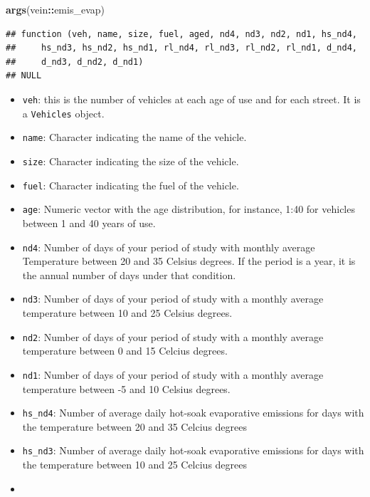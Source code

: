\documentclass[12pt,graybox,envcountchap,sectrefs]{krantz}
\makeatletter
\newenvironment{Shaded}{\begin{snugshade}}{\end{snugshade}}
\newcommand{\KeywordTok}[1]{\textcolor[rgb]{0.13,0.29,0.53}{\textbf{#1}}}
\newcommand{\OperatorTok}[1]{\textcolor[rgb]{0.81,0.36,0.00}{\textbf{#1}}}
\newcommand{\NormalTok}[1]{#1}
\providecommand{\tightlist}{%
  \setlength{\itemsep}{0pt}\setlength{\parskip}{0pt}}
\newenvironment{kframe}{%
\medskip{}
\setlength{\fboxsep}{.8em}
 \def\at@end@of@kframe{}%
 \ifinner\ifhmode%
  \def\at@end@of@kframe{\end{minipage}}%
  \begin{minipage}{\columnwidth}%
 \fi\fi%
 \def\FrameCommand##1{\hskip\@totalleftmargin \hskip-\fboxsep
 \colorbox{shadecolor}{##1}\hskip-\fboxsep
     \hskip-\linewidth \hskip-\@totalleftmargin \hskip\columnwidth}%
 \MakeFramed {\advance\hsize-\width
   \@totalleftmargin\z@ \linewidth\hsize
   \@setminipage}}%
 {\par\unskip\endMakeFramed%
 \at@end@of@kframe}
\renewenvironment{Shaded}{\begin{kframe}}{\end{kframe}}
\theoremstyle{definition}
\theoremstyle{definition}
\theoremstyle{definition}
\theoremstyle{remark}
\makeatother
\begin{document}
\begin{Shaded}
\begin{Highlighting}[]
\KeywordTok{args}\NormalTok{(vein}\OperatorTok{::}\NormalTok{emis_evap)}
\end{Highlighting}
\end{Shaded}

\begin{verbatim}
## function (veh, name, size, fuel, aged, nd4, nd3, nd2, nd1, hs_nd4, 
##     hs_nd3, hs_nd2, hs_nd1, rl_nd4, rl_nd3, rl_nd2, rl_nd1, d_nd4, 
##     d_nd3, d_nd2, d_nd1) 
## NULL
\end{verbatim}

\begin{itemize}
\tightlist
\item
  \texttt{veh}: this is the number of vehicles at each age of use and
  for each street. It is a \texttt{Vehicles} object.
\item
  \texttt{name}: Character indicating the name of the vehicle.
\item
  \texttt{size}: Character indicating the size of the vehicle.
\item
  \texttt{fuel}: Character indicating the fuel of the vehicle.
\item
  \texttt{age}: Numeric vector with the age distribution, for instance,
  1:40 for vehicles between 1 and 40 years of use.
\item
  \texttt{nd4}: Number of days of your period of study with monthly
  average Temperature between 20 and 35 Celsius degrees. If the period
  is a year, it is the annual number of days under that condition.
\item
  \texttt{nd3}: Number of days of your period of study with a monthly
  average temperature between 10 and 25 Celsius degrees.
\item
  \texttt{nd2}: Number of days of your period of study with a monthly
  average temperature between 0 and 15 Celcius degrees.
\item
  \texttt{nd1}: Number of days of your period of study with a monthly
  average temperature between -5 and 10 Celsius degrees.
\item
  \texttt{hs\_nd4}: Number of average daily hot-soak evaporative
  emissions for days with the temperature between 20 and 35 Celcius
  degrees
\item
  \texttt{hs\_nd3}: Number of average daily hot-soak evaporative
  emissions for days with the temperature between 10 and 25 Celcius
  degrees
\item

\end{itemize}
\end{document}
